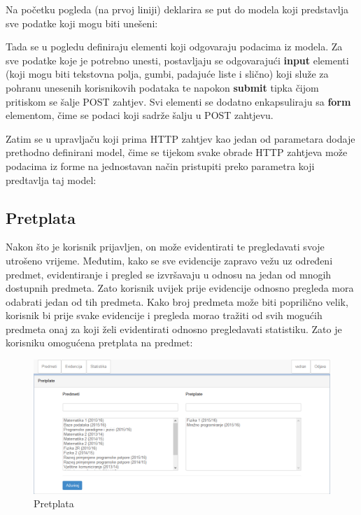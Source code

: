 \documentclass[times, utf8, zavrsni]{fer}
\begin{document}
\lstset{style=csharp}


Na početku pogleda (na prvoj liniji) deklarira se put do modela koji predstavlja sve podatke koji mogu biti unešeni:

\lstset{style=html}


Tada se u pogledu definiraju elementi koji odgovaraju podacima iz modela. Za sve podatke koje je potrebno unesti, postavljaju se odgovarajući \textbf{input} elementi (koji mogu biti tekstovna polja, gumbi, padajuće liste i slično) koji služe za pohranu unesenih korisnikovih podataka te napokon \textbf{submit} tipka čijom pritiskom se šalje POST zahtjev. Svi elementi se dodatno enkapsuliraju sa \textbf{form} elementom, čime se podaci koji sadrže šalju u POST zahtjevu.

\lstset{style=html}


Zatim se u upravljaču koji prima HTTP zahtjev kao jedan od parametara dodaje prethodno definirani model, čime se tijekom svake obrade HTTP zahtjeva može podacima iz forme na jednostavan način pristupiti preko parametra koji predtavlja taj model:

\lstset{style=csharp}


\subsection{Pretplata}
Nakon što je korisnik prijavljen, on može evidentirati te pregledavati svoje utrošeno vrijeme. Međutim, kako se sve evidencije zapravo vežu uz određeni predmet, evidentiranje i pregled se izvršavaju u odnosu na jedan od mnogih dostupnih predmeta. Zato korisnik uvijek prije evidencije odnosno pregleda mora odabrati jedan od tih predmeta. Kako broj predmeta može biti poprilično velik, korisnik bi prije svake evidencije i pregleda morao tražiti od svih mogućih predmeta onaj za koji želi evidentirati odnosno pregledavati statistiku. Zato je korisniku omogućena pretplata na predmet:

\begin{figure}[H]
\centering
\includegraphics[width=\textwidth,height=\textheight,keepaspectratio]{img/pretplata-web.png}
\caption{Pretplata}
\label{fig:pretplata-web}
\end{figure}
\end{document}
